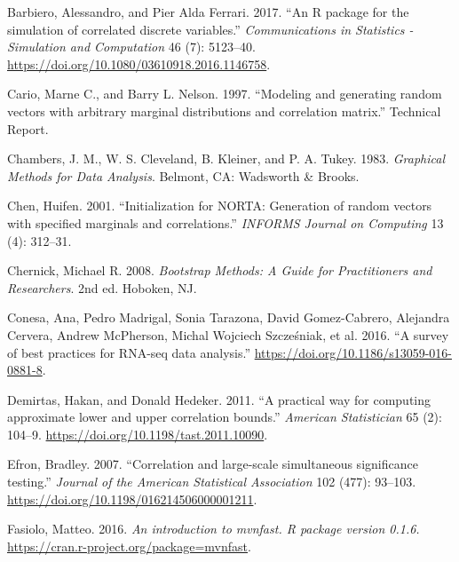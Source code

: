 \documentclass{article}
\newlength{\cslhangindent}
\newenvironment{CSLReferences}[2] %
 {%
  \setlength{\parindent}{0pt}
  \ifodd #1 \everypar{\setlength{\hangindent}{\cslhangindent}}\ignorespaces\fi
  \ifnum #2 > 0
  \setlength{\parskip}{#2\baselineskip}
  \fi
 }%
 {}
\begin{document}
\hypertarget{refs}{}
\begin{CSLReferences}{1}{0}
\leavevmode{}%
Barbiero, Alessandro, and Pier Alda Ferrari. 2017. {``{An R package for
the simulation of correlated discrete variables}.''}
\emph{Communications in Statistics - Simulation and Computation} 46 (7):
5123--40. \url{https://doi.org/10.1080/03610918.2016.1146758}.

\leavevmode{}%
Cario, Marne C., and Barry L. Nelson. 1997. {``{Modeling and generating
random vectors with arbitrary marginal distributions and correlation
matrix}.''} Technical Report.

\leavevmode{}%
Chambers, J. M., W. S. Cleveland, B. Kleiner, and P. A. Tukey. 1983.
\emph{{Graphical Methods for Data Analysis}}. Belmont, CA: Wadsworth
{\&} Brooks.

\leavevmode{}%
Chen, Huifen. 2001. {``{Initialization for NORTA: Generation of random
vectors with specified marginals and correlations}.''} \emph{INFORMS
Journal on Computing} 13 (4): 312--31.

\leavevmode{}%
Chernick, Michael R. 2008. \emph{{Bootstrap Methods: A Guide for
Practitioners and Researchers}}. 2nd ed. Hoboken, NJ.

\leavevmode{}%
Conesa, Ana, Pedro Madrigal, Sonia Tarazona, David Gomez-Cabrero,
Alejandra Cervera, Andrew McPherson, Michal Wojciech Szcześniak, et al.
2016. {``{A survey of best practices for RNA-seq data analysis}.''}
\url{https://doi.org/10.1186/s13059-016-0881-8}.

\leavevmode{}%
Demirtas, Hakan, and Donald Hedeker. 2011. {``{A practical way for
computing approximate lower and upper correlation bounds}.''}
\emph{American Statistician} 65 (2): 104--9.
\url{https://doi.org/10.1198/tast.2011.10090}.

\leavevmode{}%
Efron, Bradley. 2007. {``{Correlation and large-scale simultaneous
significance testing}.''} \emph{Journal of the American Statistical
Association} 102 (477): 93--103.
\url{https://doi.org/10.1198/016214506000001211}.

\leavevmode{}%
Fasiolo, Matteo. 2016. \emph{{An introduction to mvnfast. R package
version 0.1.6.}} \url{https://cran.r-project.org/package=mvnfast}.


\end{CSLReferences}
\end{document}
